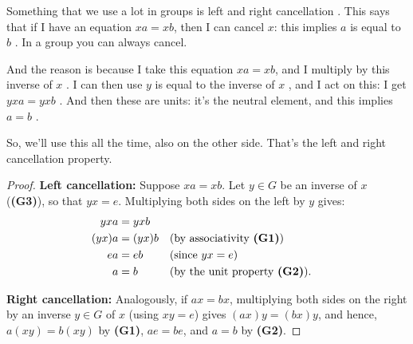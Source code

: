 \begin{speech}[00:46:33 - 00:47:40]
Something that we use a lot in groups is left and right cancellation . This says that if I have an equation $xa = xb$, then I can cancel $x$: this implies $a$ is equal to $b$ . In a group you can always cancel.

And the reason is because I take this equation $xa = xb$, and I multiply by this inverse of $x$ . I can then use $y$ is equal to the inverse of $x$ , and I act on this: I get $yxa = yxb$ . And then these are units: it's the neutral element, and this implies $a = b$ .

So, we'll use this all the time, also on the other side. That's the left and right cancellation property.
\end{speech}

\begin{content}

\begin{proof}
\textbf{Left cancellation:} Suppose $xa = xb$. Let $y \in G$ be an inverse of $x$ (\textbf{(G3)}), so that $yx = e$. Multiplying both sides on the left by $y$ gives:
\begin{align*}
yxa &= yxb \\
(yx)a &= (yx)b && \text{(by associativity \textbf{(G1)})} \\
ea &= eb && \text{(since $yx = e$)} \\
a &= b && \text{(by the unit property \textbf{(G2)}).}
\end{align*}

\textbf{Right cancellation:} Analogously, if $ax = bx$, multiplying both sides on the right by an inverse $y \in G$ of $x$ (using $xy = e$) gives $(ax)y = (bx)y$, and hence, $a(xy) = b(xy)$ by \textbf{(G1)}, $ae = be$, and $a = b$ by \textbf{(G2)}.
\end{proof}
\end{content}

